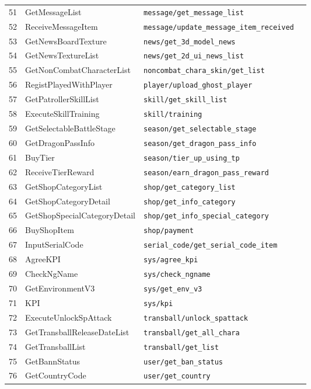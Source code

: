 \begin{longtable}{p{} p{} p{} p{}}
51  & GetMessageList & \texttt{message/get\_message\_list} \\
52  & ReceiveMessageItem & \texttt{message/update\_message\_item\_received} \\
53  & GetNewsBoardTexture & \texttt{news/get\_3d\_model\_news} \\
54  & GetNewsTextureList & \texttt{news/get\_2d\_ui\_news\_list} \\
55  & GetNonCombatCharacterList & \texttt{noncombat\_chara\_skin/get\_list} \\
56  & RegistPlayedWithPlayer & \texttt{player/upload\_ghost\_player} \\
57  & GetPatrollerSkillList & \texttt{skill/get\_skill\_list} \\
58  & ExecuteSkillTraining & \texttt{skill/training} \\
59  & GetSelectableBattleStage & \texttt{season/get\_selectable\_stage} \\
60  & GetDragonPassInfo & \texttt{season/get\_dragon\_pass\_info} \\
61  & BuyTier & \texttt{season/tier\_up\_using\_tp} \\
62  & ReceiveTierReward & \texttt{season/earn\_dragon\_pass\_reward} \\
63  & GetShopCategoryList & \texttt{shop/get\_category\_list} \\
64  & GetShopCategoryDetail & \texttt{shop/get\_info\_category} \\
65  & GetShopSpecialCategoryDetail & \texttt{shop/get\_info\_special\_category} \\
66  & BuyShopItem & \texttt{shop/payment} \\
67  & InputSerialCode & \texttt{serial\_code/get\_serial\_code\_item} \\
68  & AgreeKPI & \texttt{sys/agree\_kpi} \\
69  & CheckNgName & \texttt{sys/check\_ngname} \\
70  & GetEnvironmentV3 & \texttt{sys/get\_env\_v3} \\
71  & KPI & \texttt{sys/kpi} \\
72  & ExecuteUnlockSpAttack & \texttt{transball/unlock\_spattack} \\
73  & GetTransballReleaseDateList & \texttt{transball/get\_all\_chara} \\
74  & GetTransballList & \texttt{transball/get\_list} \\
75  & GetBannStatus & \texttt{user/get\_ban\_status} \\
76  & GetCountryCode & \texttt{user/get\_country} \\

\end{longtable}
